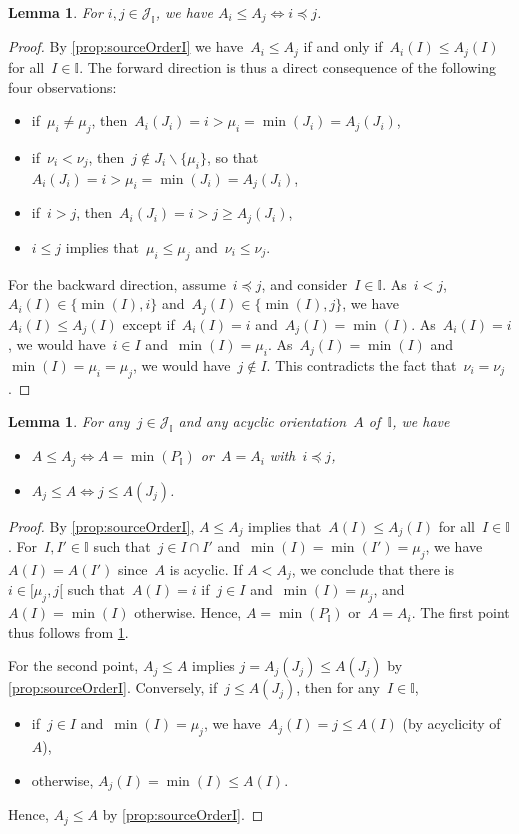 \documentclass{amsart}
\newtheorem{lemma}[theorem]{Lemma}
\theoremstyle{definition}
\newcommand{\cal}[1]{\mathcal{#1}} %
\newcommand{\ssm}{\smallsetminus} %
\newcommand{\II}{\mathbb I} %
\newcommand{\cJ}{\cal{J}} %
\begin{document}
\begin{lemma}
\label{lem:irrorder}
For $i,j \in \cJ_\II$, we have $A_i \le A_j \iff i \preccurlyeq j$.
\end{lemma}

\begin{proof}
By \cref{prop:sourceOrderI} we have~$A_i \le A_j$ if and only if~$A_i(I) \le A_j(I)$ for all~$I \in \II$.
%
The forward direction is thus a direct consequence of the following four observations:
\begin{itemize}
\item if~$\mu_i \ne \mu_j$, then~$A_i(J_i) = i > \mu_i = \min(J_i) = A_j(J_i)$,
\item if~$\nu_i < \nu_j$, then~$j \notin J_i \ssm \{\mu_i\}$, so that~$A_i(J_i) = i > \mu_i = \min(J_i) = A_j(J_i)$,
\item if~$i > j$, then~$A_i(J_i) = i > j \ge A_j(J_i)$,
\item $i \le j$ implies that~$\mu_i \le \mu_j$ and~$\nu_i \le \nu_j$.
\end{itemize}
%
For the backward direction, assume~$i \preccurlyeq j $, and consider~$I \in \II$.
As~$i < j$, $A_i(I) \in \{\min(I), i\}$ and~$A_j(I) \in \{\min(I), j\}$, we have~$A_i(I) \le A_j(I)$ except if~$A_i(I) = i$ and~$A_j(I) = \min(I)$.
As~$A_i(I) = i$, we would have~$i \in I$ and~$\min(I) = \mu_i$. As~$A_j(I) = \min(I)$ and~$\min(I) = \mu_i = \mu_j$, we would have~$j \notin I$.
This contradicts the fact that~$\nu_i = \nu_j$.
\end{proof}

\begin{lemma}
\label{lem:subirr}
For any~$j \in \cJ_\II$ and any acyclic orientation~$A$ of~$\II$, we have
\begin{itemize}
\item $A \le A_j \iff A = \min(P_\II)$ or~$A = A_i$ with~$i \preccurlyeq j$,
\item $A_j \le A \iff j \le A(J_j)$.
\end{itemize}
\end{lemma}

\begin{proof}
By \cref{prop:sourceOrderI}, $A \le A_j$ implies that~$A(I) \le A_j(I)$ for all~$I \in \II$.
For~$I, I' \in \II$ such that~$j \in I \cap I'$ and~$\min(I) = \min(I') = \mu_j$, we have~$A(I) = A(I')$ since~$A$ is acyclic.
If $A<A_j$, we conclude that there is~$i \in {[\mu_j, j[}$ such that~$A(I) = i$ if~$j \in I$ and~$\min(I) = \mu_j$, and~$A(I) = \min(I)$ otherwise.
Hence, $A = \min(P_\II)$ or~$A = A_i$.
The first point thus follows from \cref{lem:irrorder}.

For the second point, $A_j \le A$ implies $j = A_j(J_j) \le A(J_j)$ by \cref{prop:sourceOrderI}.
Conversely, if~$j \le A(J_j)$, then for any~$I \in \II$,
\begin{itemize}
\item if~$j \in I$ and~$\min(I) = \mu_j$, we have~$A_j(I) = j \le A(I)$ (by acyclicity of~$A$),
\item otherwise, $A_j(I) = \min(I) \le A(I)$.
\end{itemize}
Hence, $A_j \le A$ by \cref{prop:sourceOrderI}.
\end{proof}
\end{document}
